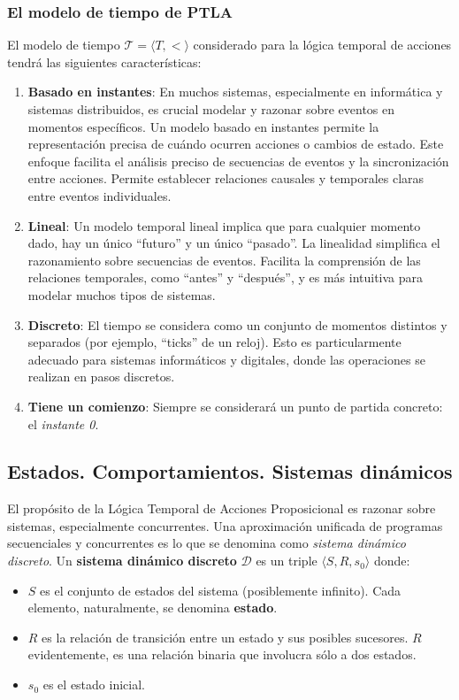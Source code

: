 \subsubsection{El modelo de tiempo de PTLA}\label{subsubsection:TLAtimedecision}
El modelo de tiempo $\mathcal{T} = \langle T, < \rangle$ considerado para la lógica temporal de acciones tendrá las siguientes características:
\begin{enumerate}
    \item \textbf{Basado en instantes}: En muchos sistemas, especialmente en informática y sistemas distribuidos, es crucial modelar y razonar sobre eventos en momentos específicos. Un modelo basado en instantes permite la representación precisa de cuándo ocurren acciones o cambios de estado. Este enfoque facilita el análisis preciso de secuencias de eventos y la sincronización entre acciones. Permite establecer relaciones causales y temporales claras entre eventos individuales.
    \item \textbf{Lineal}: Un modelo temporal lineal implica que para cualquier momento dado, hay un único ``futuro'' y un único ``pasado''. La linealidad simplifica el razonamiento sobre secuencias de eventos. Facilita la comprensión de las relaciones temporales, como ``antes'' y ``después'', y es más intuitiva para modelar muchos tipos de sistemas.
    \item \textbf{Discreto}: El tiempo se considera como un conjunto de momentos distintos y separados (por ejemplo, ``ticks'' de un reloj). Esto es particularmente adecuado para sistemas informáticos y digitales, donde las operaciones se realizan en pasos discretos.
    \item \textbf{Tiene un comienzo}: Siempre se considerará un punto de partida concreto: el \textit{instante 0}.
\end{enumerate}

\subsection{Estados. Comportamientos. Sistemas dinámicos}\label{subsection:TLAsystems}
El propósito de la Lógica Temporal de Acciones Proposicional es razonar sobre sistemas, especialmente concurrentes. Una aproximación unificada de programas secuenciales y concurrentes es lo que se denomina como \textit{sistema dinámico discreto}. Un \textbf{sistema dinámico discreto} $\mathcal{D}$ es un triple $\langle S, R, s_0 \rangle$ donde:

\begin{itemize}
    \item $S$ es el conjunto de estados del sistema (posiblemente infinito). Cada elemento, naturalmente, se denomina \textbf{estado}.
    \item $R$ es la relación de transición entre un estado y sus posibles sucesores. $R$ evidentemente, es una relación binaria que involucra sólo a dos estados.
    \item $s_0$ es el estado inicial.
\end{itemize}

